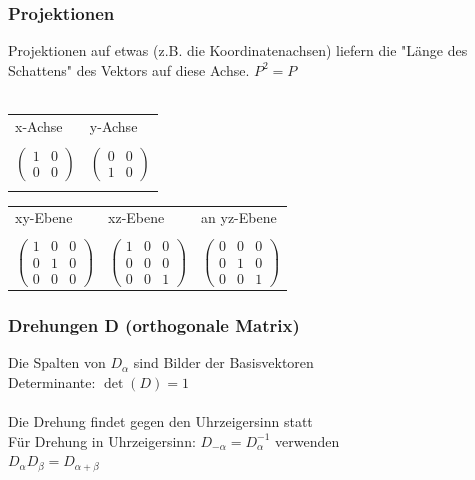 			\subsubsection{Projektionen}		
			Projektionen auf etwas (z.B. die Koordinatenachsen) liefern die "Länge des Schattens" des Vektors auf diese Achse. \qquad $P^2 = P$ \\
			\\
			\begin{tabular}{ll}
		  	x-Achse & y-Achse \\
		  	\\
		  	$\begin{pmatrix} 1 & 0  \\ 0 & 0  \end{pmatrix}$ & $\begin{pmatrix} 0 & 0  \\ 1 & 0  \end{pmatrix}$  \\
		  	\\
		  	\end{tabular}				
			
			\begin{tabular}{lll}
		  	xy-Ebene & xz-Ebene & an yz-Ebene\\
		  	\\
		  	$\begin{pmatrix} 1 & 0 & 0 \\ 0 & 1 & 0 \\ 0 & 0 & 0 \end{pmatrix}$ & $\begin{pmatrix} 1 & 0 & 0 \\ 0 & 0 & 0 \\ 0 & 0 & 1 \end{pmatrix}$ & $\begin{pmatrix} 0 & 0 & 0 \\ 0 & 1 & 0 \\ 0 & 0 & 1 \end{pmatrix}$ \\
		  	\end{tabular}		  	
		  	
		  	\subsubsection{Drehungen D (orthogonale Matrix)}
		  	Die Spalten von $D_{\alpha}$ sind Bilder der Basisvektoren \\
		  	Determinante: \quad $\det(D) = 1$\\	
		  	\\
		  	Die Drehung findet gegen den Uhrzeigersinn statt \\
		  	Für Drehung in Uhrzeigersinn: $D_{-\alpha} = D_{\alpha}^{-1}$ verwenden \\
		  	$D_{\alpha} D_{\beta} = D_{\alpha + \beta}$ \\
		  	
